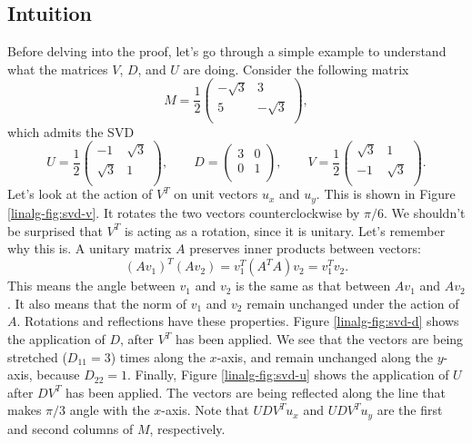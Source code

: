 \documentclass{article}
\theoremstyle{definition}
\begin{document}
\subsection{Intuition}
Before delving into the proof, let's go through a simple example to understand what the matrices $V$, $D$, and $U$ are doing. Consider the following matrix
\begin{equation}
    M = \frac{1}{2}
    \begin{pmatrix}
        -\sqrt{3} & 3 \\
        5 & -\sqrt{3} \\
    \end{pmatrix},
\end{equation}
which admits the SVD
\begin{equation}
    U = \frac{1}{2}
    \begin{pmatrix}
        -1 & \sqrt{3} \\
        \sqrt{3} & 1 \\
    \end{pmatrix}, \qquad
    D =
    \begin{pmatrix}
        3 & 0 \\
        0 & 1 \\
    \end{pmatrix}, \qquad
    V = \frac{1}{2}
    \begin{pmatrix}
        \sqrt{3} & 1 \\
        -1 & \sqrt{3} \\
    \end{pmatrix}.
\end{equation}
Let's look at the action of $V^T$ on unit vectors $u_x$ and $u_y$. This is shown in Figure \ref{linalg-fig:svd-v}. It rotates the two vectors counterclockwise by $\pi/6$. We shouldn't be surprised that $V^T$ is acting as a rotation, since it is unitary. Let's remember why this is. A unitary matrix $A$ preserves inner products between vectors:
\begin{equation}
    (Av_1)^T(Av_2) = v_1^T(A^TA)v_2 = v_1^Tv_2.
\end{equation}
This means the angle between $v_1$ and $v_2$ is the same as that between $Av_1$ and $Av_2$. It also means that the norm of $v_1$ and $v_2$ remain unchanged under the action of $A$. Rotations and reflections have these properties.
Figure \ref{linalg-fig:svd-d} shows the application of $D$, after $V^T$ has been applied. We see that the vectors are being stretched ($D_{11}=3$) times along the $x$-axis, and remain unchanged along the $y$-axis, because $D_{22}=1$.
Finally, Figure \ref{linalg-fig:svd-u} shows the application of $U$ after $DV^T$ has been applied. The vectors are being reflected along the line that makes $\pi/3$ angle with the $x$-axis. Note that $UDV^Tu_x$ and $UDV^Tu_y$ are the first and second columns of $M$, respectively.
\end{document}
